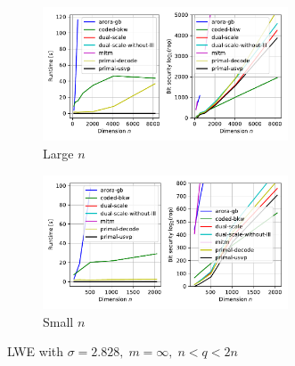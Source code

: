 \begin{figure}[h!]
    \centering
    \begin{subfigure}{1\textwidth}
        \centering
        \includegraphics[width=0.8\textwidth]{graphics/LWE_plot_long.pdf}
        \caption{Large $n$}
    \end{subfigure}
    \begin{subfigure}{1\textwidth}
        \centering
        \includegraphics[width=0.8\textwidth]{graphics/LWE_plot_long_small.pdf}
        \caption{Small $n$}
    \end{subfigure}
    \caption{LWE with $\sigma=2.828,\; m=\infty, \; n < q < 2n$}\label{fig:LWE-other-sigma}
\end{figure}
